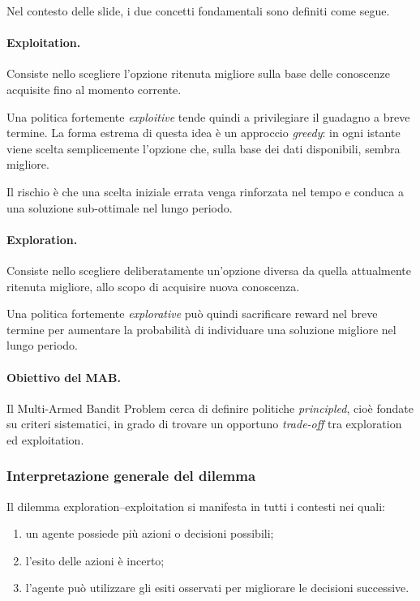 Nel contesto delle slide, i due concetti fondamentali sono definiti come segue.

\paragraph{Exploitation.}
Consiste nello scegliere l'opzione ritenuta migliore sulla base delle conoscenze acquisite fino al momento corrente.

Una politica fortemente \emph{exploitive} tende quindi a privilegiare il guadagno a breve termine. La forma estrema di questa idea è un approccio \emph{greedy}: in ogni istante viene scelta semplicemente l'opzione che, sulla base dei dati disponibili, sembra migliore.

Il rischio è che una scelta iniziale errata venga rinforzata nel tempo e conduca a una soluzione sub-ottimale nel lungo periodo.

\paragraph{Exploration.}
Consiste nello scegliere deliberatamente un'opzione diversa da quella attualmente ritenuta migliore, allo scopo di acquisire nuova conoscenza.

Una politica fortemente \emph{explorative} può quindi sacrificare reward nel breve termine per aumentare la probabilità di individuare una soluzione migliore nel lungo periodo.

\paragraph{Obiettivo del MAB.}
Il Multi-Armed Bandit Problem cerca di definire politiche \emph{principled}, cioè fondate su criteri sistematici, in grado di trovare un opportuno \emph{trade-off} tra exploration ed exploitation.

\subsubsection{Interpretazione generale del dilemma}

Il dilemma exploration--exploitation si manifesta in tutti i contesti nei quali:
\begin{enumerate}
    \item un agente possiede più azioni o decisioni possibili;
    \item l'esito delle azioni è incerto;
    \item l'agente può utilizzare gli esiti osservati per migliorare le decisioni successive.
\end{enumerate}

